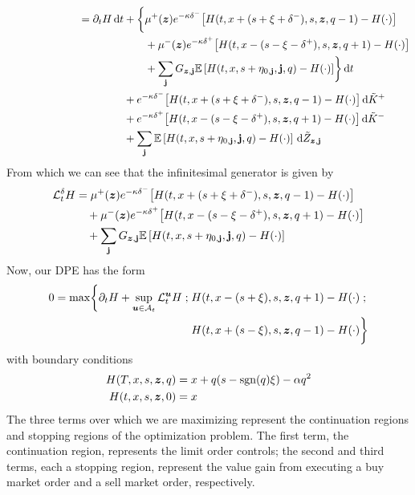 \begin{align}
\begin{split}
{}\phantom{\d H (t,x,s,\bz,q)} & = \partial_t H \dt + \biggl\lbrace \mu^+(\bz) e^{ -\kappa \delta^{-}} \bigl[ H(t,x+(s+\xi+\delta^-),s,\bz,q-1) - H(\cdot) \bigr] \\
& \hphantom{{}={} \partial_t H \dt +\biggl\lbrace} + \mu^-(\bz) e^{ -\kappa \delta^{+}} \bigl[ H(t,x-(s-\xi-\delta^+),s,\bz,q+1) - H(\cdot) \bigr] \\
& \hphantom{{}={} \partial_t H \dt +\biggl\lbrace} + \sum_{\bj} G_{\bz,\bj} \E \left[ H(t,x,s+\eta_{0,\bj},\bj,q) - H(\cdot) \right]  \biggr\rbrace \dt \\
& \hphantom{{}={} \partial_t H \dt} + e^{ -\kappa \delta^{-}} \bigl[ H(t,x+(s+\xi+\delta^-),s,\bz,q-1) - H(\cdot) \bigr] \d \tilde{K}^+\\
& \hphantom{{}={} \partial_t H \dt} + e^{ -\kappa \delta^{+}} \bigl[ H(t,x-(s-\xi-\delta^+),s,\bz,q+1) - H(\cdot) \bigr] \d \tilde{K}^-\\
& \hphantom{{}={} \partial_t H \dt} + \sum_{\bj} \E \left[ H(t,x,s+\eta_{0,\bj},\bj,q) - H(\cdot) \right] \d \tilde{Z}_{\bz,\bj}
\end{split}
\end{align}
From which we can see that the infinitesimal generator is given by
\begin{equation}\label{eq:infgen}
\begin{split}
\mathcal{L}^{\delta}_t H & = \mu^+(\bm{z}) e^{ -\kappa \delta^{-}} \bigl[ H(t,x+(s+\xi+\delta^-),s,\bm{z},q-1) - H(\cdot) \bigr] \\
& \quad + \mu^-(\bm{z}) e^{ -\kappa \delta^{+}} \bigl[ H(t,x-(s-\xi-\delta^+),s,\bm{z},q+1) - H(\cdot) \bigr] \\
& \quad + \sum_{\mathbf{j}} G_{\bm{z},\mathbf{j}} \mathbb{E} \left[ H(t,x,s+\eta_{0,\mathbf{j}},\mathbf{j},q) - H(\cdot) \right]
\end{split}
\end{equation}
Now, our DPE has the form
\begin{equation}\label{eq:DPEmaxprofit}
\begin{split}
0 = \max \biggl\lbrace \partial_t H + \sup \limits_{\bm{u} \in \mathcal{A}_t} \mathcal{L}^{\bm{u}}_t H \; ; \; & H(t,x-(s+\xi), s, \bm{z}, q+1) - H(\cdot) \; ; \\
&  H(t,x+(s-\xi), s, \bm{z}, q-1) - H(\cdot) \biggr\rbrace
\end{split}
\end{equation}
with boundary conditions
\begin{align}
H(T, x, s, \bm{z}, q) & = x + q(s - \mathrm{sgn}(q)\xi) - \alpha q^2 \\
H(t, x, s, \bm{z}, 0) & = x
\end{align}
The three terms over which we are maximizing represent the continuation regions and stopping regions of the optimization problem. The first term, the continuation region, represents the limit order controls; the second and third terms, each a stopping region, represent the value gain from executing a buy market order and a sell market order, respectively.

